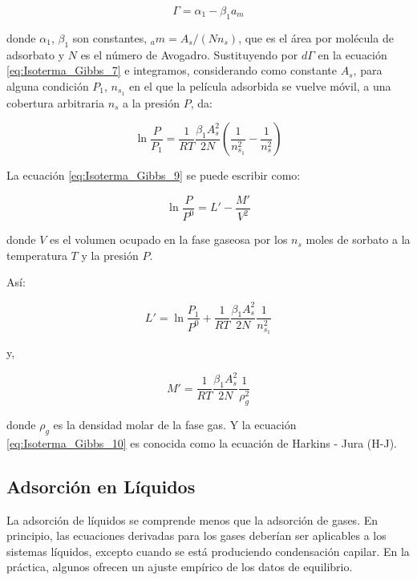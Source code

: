 \documentclass[11pt]{book}
\begin{document}
\begin{equation}
    \label{eq:Isoterma_Gibbs_8}
    \Gamma = \alpha_1 - \beta_1 a_m
\end{equation}

donde $\alpha_1$, $\beta_1$ son constantes, $_am=A_s/(N n_s)$, que es el área por molécula de adsorbato y $N$ es el número de Avogadro. Sustituyendo por $d\Gamma$ en la ecuación \ref{eq:Isoterma_Gibbs_7} e integramos, considerando como constante $A_s$, para alguna condición $P_1$, $n_{s_1}$ en el que la película adsorbida se vuelve móvil, a una cobertura arbitraria $n_s$ a la presión $P$, da: 

\begin{equation}
    \label{eq:Isoterma_Gibbs_9}
    \ln{\frac{P}{P_1}} = \frac{1}{RT} \frac{\beta_1 A_s^2}{2N} \left( \frac{1}{n_{s_1}^2} - \frac{1}{n_s^2}\right)
\end{equation}

La ecuación \ref{eq:Isoterma_Gibbs_9} se puede escribir como:

\begin{equation}
    \label{eq:Isoterma_Gibbs_10}
    \ln{\frac{P}{P^0}} = L' - \frac{M'}{V^2}
\end{equation}

donde $V$ es el volumen ocupado en la fase gaseosa por los $n_s$ moles de sorbato a la temperatura $T$ y la presión $P$.

Así:

\begin{equation}
    \label{eq:Isoterma_Gibbs_11}
    L' = \ln{\frac{P_1}{P^0}} + \frac{1}{RT} \frac{\beta_1 A_s^2}{2N} \frac{1}{n_{s_1}^2}
\end{equation}

y,

\begin{equation}
    \label{eq:Isoterma_Gibbs_11a}
    M' = \frac{1}{RT} \frac{\beta_1 A_s^2}{2N} \frac{1}{\rho_g^2}
\end{equation}

donde $\rho_g$ es la densidad molar de la fase gas. Y la ecuación \ref{eq:Isoterma_Gibbs_10} es conocida como la ecuación de Harkins - Jura (H-J). 
\subsection{Adsorción en Líquidos}

La adsorción de líquidos se comprende menos que la adsorción de gases. En principio, las ecuaciones derivadas para los gases deberían ser aplicables a los sistemas líquidos, excepto cuando se está produciendo condensación capilar. En la práctica, algunos ofrecen un ajuste empírico de los datos de equilibrio.
\end{document}
